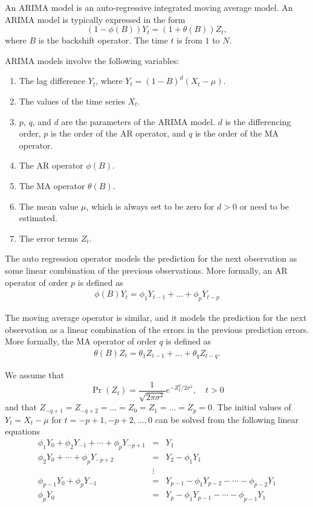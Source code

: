 \documentclass[english,12pt]{article}
\theoremstyle{algorithm}
\begin{document}
An ARIMA model is an auto-regressive integrated moving average model. An ARIMA
model is typically expressed in the form
\begin{equation}
(1 - \phi(B)) Y_t  = (1 + \theta(B)) Z_t,
\end{equation}
where $B$ is the backshift operator. The time $t$ is from $1$ to $N$.

ARIMA models involve the following variables:
\begin{enumerate}
   \item The lag difference $Y_{t}$, where  $Y_{t} = (1-B)^{d}(X_{t} - \mu)$.
    \item The values of the time series $X_t$.
    \item $p$, $q$, and $d$ are the parameters of the ARIMA model.
      $d$ is the differencing order, $p$ is the order of the AR
      operator, and $q$ is the order of the MA operator.
    \item The AR operator $\phi(B)$.
    \item The MA operator $\theta(B)$.
    \item The mean value $\mu$, which is always set to be zero for
      $d>0$ or need to be estimated.
    \item The error terms $Z_t$.
\end{enumerate}

The  auto regression operator models the prediction for the next
observation  as some linear combination of the previous observations.
More formally, an AR operator of order $p$ is defined as
\begin{align}
\phi(B) Y_t= \phi_1 Y_{t-1}   + \dots +  \phi_{p} Y_{t-p}
\end{align}

The moving average operator is similar, and it models the prediction
for the next observation as a linear combination of the errors in the
previous prediction errors.  More formally, the MA operator of order
$q$ is defined as
\begin{align}
\theta(B) Z_t =   \theta_{1} Z_{t-1} + \dots + \theta_{q} Z_{t-q}.
\end{align}

We assume that
\begin{equation}
\Pr(Z_t) = \frac{1}{\sqrt{2 \pi \sigma^2}} e^{-Z^2_t/2 \sigma^2}, \quad t > 0
\end{equation}
and that  $Z_{-q+1} = Z_{-q+2} = \dots = Z_0 = Z_1 = \dots = Z_p =
0$. The initial values of $Y_t=X_t-\mu$ for $t=-p+1, -p+2, \dots,
0$ can be solved from the following linear equations
\begin{eqnarray}
\phi_1 Y_0 + \phi_2 Y_{-1} + \cdots + \phi_p Y_{-p+1} &=& Y_1 \nonumber\\
\phi_2 Y_0 + \cdots + \phi_p Y_{-p+2} &=& Y_2 - \phi_1 Y_1  \nonumber\\
&\vdots& \nonumber\\
\phi_{p-1} Y_0 + \phi_p Y_{-1} &=& Y_{p-1} - \phi_1 Y_{p-2} - \cdots -
\phi_{p-2} Y_1 \nonumber \\
\phi_p Y_0  &=& Y_p - \phi_1 Y_{p-1} - \cdots - \phi_{p-1} Y_{1} \label{eq:init_Y}
\end{eqnarray}
\end{document}
